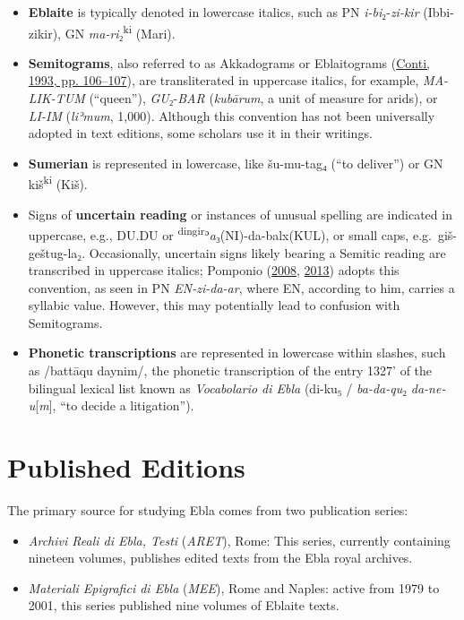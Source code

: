 \documentclass[
]{book}
\providecommand{\tightlist}{%
  \setlength{\itemsep}{0pt}\setlength{\parskip}{0pt}}
\begin{document}
\begin{itemize}
\tightlist
\item
  \textbf{Eblaite} is typically denoted in lowercase italics, such as PN \emph{i-bi}₂-\emph{zi-kir} (Ibbi-zikir), GN \emph{ma-ri}₂\textsuperscript{ki} (Mari).
\item
  \textbf{Semitograms}, also referred to as Akkadograms or Eblaitograms (\protect\hyperlink{ref-Conti1993}{Conti, 1993, pp. 106--107}), are transliterated in uppercase italics, for example, \emph{MA-LIK-TUM} (``queen''), \emph{GU}₂-\emph{BAR} (\emph{kubārum}, a unit of measure for arids), or \emph{LI-IM} (\emph{liʾmum}, 1,000). Although this convention has not been universally adopted in text editions, some scholars use it in their writings.
\item
  \textbf{Sumerian} is represented in lowercase, like šu-mu-tag₄ (``to deliver'') or GN kiš\textsuperscript{ki} (Kiš).
\item
  Signs of \textbf{uncertain reading} or instances of unusual spelling are indicated in uppercase, e.g., DU.DU or \textsuperscript{dingir}ʾ\emph{a}₃(NI)-da-balx(KUL), or small caps, e.g.~{giš}-geštug-la₂. Occasionally, uncertain signs likely bearing a Semitic reading are transcribed in uppercase italics; Pomponio (\protect\hyperlink{ref-Pomponio2008a}{2008}, \protect\hyperlink{ref-Pomponio2013a}{2013}) adopts this convention, as seen in PN \emph{EN-zi-da-ar}, where EN, according to him, carries a syllabic value. However, this may potentially lead to confusion with Semitograms.
\item
  \textbf{Phonetic transcriptions} are represented in lowercase within slashes, such as /battāqu daynim/, the phonetic transcription of the entry 1327' of the bilingual lexical list known as \emph{Vocabolario di Ebla} (di-ku₅ / \emph{ba-da-qu}₂ \emph{da-ne-u}{[}\emph{m}{]}, ``to decide a litigation'').
\end{itemize}

\hypertarget{published-editions}{%
\section{Published Editions}\label{published-editions}}

The primary source for studying Ebla comes from two publication series:

\begin{itemize}
\tightlist
\item
  \emph{Archivi Reali di Ebla, Testi} (\emph{ARET}), Rome: This series, currently containing nineteen volumes, publishes edited texts from the Ebla royal archives.
\item
  \emph{Materiali Epigrafici di Ebla} (\emph{MEE}), Rome and Naples: active from 1979 to 2001, this series published nine volumes of Eblaite texts.
\end{itemize}
\end{document}
